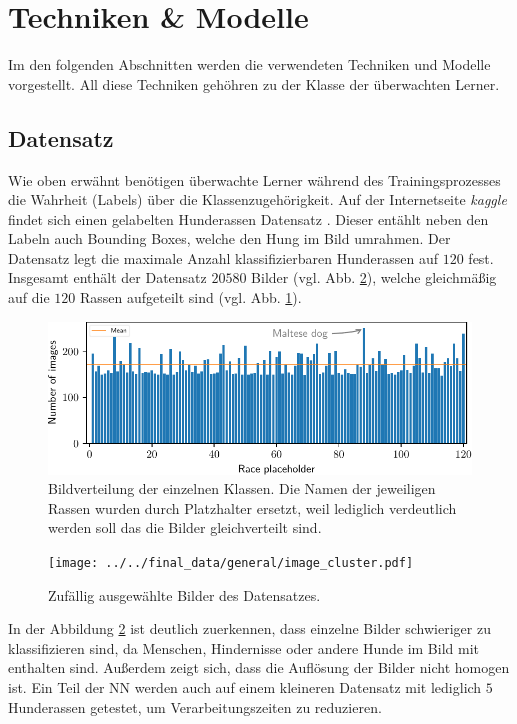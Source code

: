 \section{Techniken \& Modelle}
Im den folgenden Abschnitten werden die verwendeten Techniken und Modelle
vorgestellt. All diese Techniken gehöhren zu der Klasse der überwachten
Lerner.
\subsection{Datensatz}
Wie oben erwähnt benötigen überwachte Lerner während des Trainingsprozesses
die Wahrheit (Labels) über die Klassenzugehörigkeit. Auf der Internetseite \emph{kaggle}
findet sich einen gelabelten
Hunderassen Datensatz \cite{datensatz}. Dieser entählt neben den Labeln auch
Bounding Boxes, welche den Hung im Bild umrahmen.
Der Datensatz legt die maximale Anzahl klassifizierbaren Hunderassen auf $120$ fest.
Insgesamt enthält der Datensatz $20580$ Bilder (vgl. Abb. \ref{fig:bilder_cluser}), welche gleichmäßig auf die $120$ Rassen aufgeteilt sind (vgl. Abb. \ref{fig:gleichverteilung_bilder}).
\begin{figure}
\centering
\includegraphics[width=\the\textwidth]{../../final_data/general/image_distribution.pdf}
\caption{Bildverteilung der einzelnen Klassen. Die Namen der jeweiligen Rassen
         wurden durch Platzhalter ersetzt, weil lediglich verdeutlich werden soll
         das die Bilder gleichverteilt sind.}
\label{fig:gleichverteilung_bilder}
\end{figure}
\begin{figure}
\centering
\texttt{[image: ../../final\_data/general/image\_cluster.pdf]}
\caption{Zufällig ausgewählte Bilder des Datensatzes.}
\label{fig:bilder_cluser}
\end{figure}
In der Abbildung \ref{fig:bilder_cluser} ist deutlich zuerkennen,
dass einzelne Bilder schwieriger zu klassifizieren sind,
da Menschen, Hindernisse oder andere Hunde im Bild mit enthalten sind. Außerdem
zeigt sich, dass die Auflösung der Bilder nicht homogen ist.
Ein Teil der NN werden auch auf einem kleineren Datensatz mit lediglich $5$ Hunderassen
getestet, um Verarbeitungszeiten zu reduzieren.

